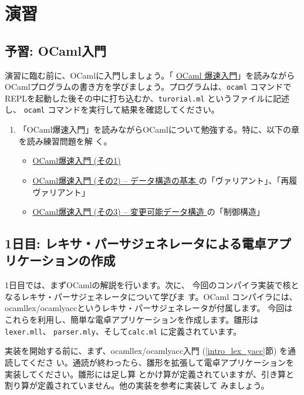\documentclass[a4paper,11pt]{jsarticle}
\begin{document}
\newpage
\section{演習}

\subsection{予習: OCaml入門}

演習に臨む前に、OCamlに入門しましょう。「
\href{https://www.fos.kuis.kyoto-u.ac.jp/~igarashi/class/pl/03-ocaml.html#quick-intro-ocaml}{OCaml
  爆速入門}」を読みながらOCamlプログラムの書き方を学びましょう。プログラムは、\verb|ocaml|
コマンドでREPLを起動した後その中に打ち込むか、\verb|turorial.ml| というファイルに記述し、
\verb|ocaml| コマンドを実行して結果を確認してください。

\begin{enumerate}
\item 「OCaml爆速入門」を読みながらOCamlについて勉強する。特に、以下の章を読み練習問題を解
  く。
  \begin{itemize}
  \item
    \href{https://www.fos.kuis.kyoto-u.ac.jp/~igarashi/class/pl/03-ocaml.html#quick-intro-ocaml}{
      OCaml爆速入門 (その1)}
  \item
    \href{https://www.fos.kuis.kyoto-u.ac.jp/~igarashi/class/pl/03-ocaml.html#quick-intro-ocaml2}{
      OCaml爆速入門 (その2) -- データ構造の基本
    } の「ヴァリアント」、「再履ヴァリアント」
  \item
    \href{https://www.fos.kuis.kyoto-u.ac.jp/~igarashi/class/pl/03-ocaml.html#quick-intro-ocaml2}{
      OCaml爆速入門 (その3) -- 変更可能データ構造
    } の「制御構造」
  \end{itemize}
\end{enumerate}

\subsection{1日目: レキサ・パーサジェネレータによる電卓アプリケーションの作成}

1日目では、まずOCamlの解説を行います。次に、
今回のコンパイラ実装で核となるレキサ・パーサジェネレータについて学びま
す。OCaml コンパイラには、ocamllex/ocamlyaccというレキサ・パーサジェネレータが付属します。
今回はこれらを利用し、簡単な電卓アプリケーションを作成します。雛形は \verb|lexer.mll|、
\verb|parser.mly|、そして\verb|calc.ml| に定義されています。

実装を開始する前に、まず、ocamllex/ocamlyacc入門 (\ref{intro_lex_yacc}節) を通読してくださ
い。通読が終わったら、雛形を拡張して電卓アプリケーションを実装してください。雛形には足し算
とかけ算が定義されていますが、引き算と割り算が定義されていません。他の実装を参考に実装して
みましょう。
\end{document}
